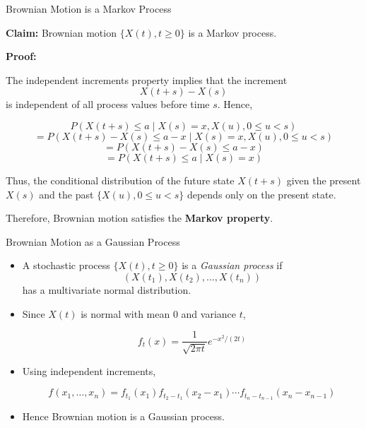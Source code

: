 \documentclass{beamer}
\begin{document}
	\begin{frame}{Brownian Motion is a Markov Process}
		
		\textbf{Claim:} Brownian motion $\{X(t), t \ge 0\}$ is a Markov process.
		
		\vspace{0.3cm}
		
		\textbf{Proof:}
		
		The independent increments property implies that the increment
		\[
		X(t+s) - X(s)
		\]
		is independent of all process values before time $s$.
		Hence,
		
		\[
		P(X(t+s) \le a \mid X(s)=x, X(u), 0 \le u < s)
		\]
		\[
		= P(X(t+s)-X(s) \le a-x \mid X(s)=x, X(u), 0 \le u < s)
		\]
		\[
		= P(X(t+s)-X(s) \le a-x)
		\]
		\[
		= P(X(t+s) \le a \mid X(s)=x)
		\]
		
		\vspace{0.3cm}
		
		Thus, the conditional distribution of the future state $X(t+s)$ given the
		present $X(s)$ and the past $\{X(u), 0 \le u < s\}$ depends only on the
		present state.
		
		\vspace{0.2cm}
		
		Therefore, Brownian motion satisfies the \textbf{Markov property}.
		
	\end{frame}
	
	\begin{frame}{Brownian Motion as a Gaussian Process}
		
		\begin{itemize}
			
			\item<1-> A stochastic process $\{X(t), t \ge 0\}$ is a \textit{Gaussian process} if
			\[
			(X(t_1), X(t_2), \ldots, X(t_n))
			\]
			has a multivariate normal distribution.
			
			\item<2-> Since $X(t)$ is normal with mean $0$ and variance $t$,
			
			\[
			f_t(x) = \frac{1}{\sqrt{2\pi t}} e^{-x^2/(2t)}
			\]
			
			\item<3-> Using independent increments,
			
			\[
			f(x_1,\dots,x_n)
			=
			f_{t_1}(x_1)
			f_{t_2-t_1}(x_2-x_1)
			\cdots
			f_{t_n-t_{n-1}}(x_n-x_{n-1})
			\]
			
			\item<4-> Hence Brownian motion is a Gaussian process.
			
		\end{itemize}
		
	\end{frame}
	
\end{document}
